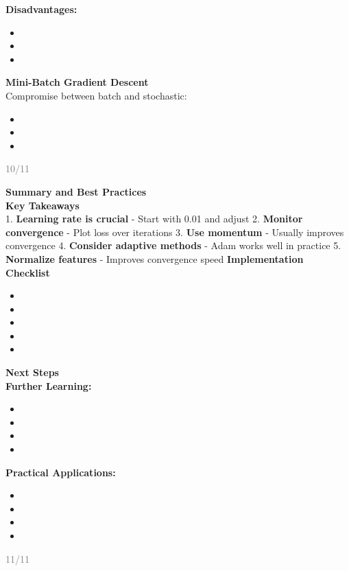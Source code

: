 \documentclass[11pt]{article}
\begin{document}
\textbf{Disadvantages:}
\begin{itemize}
\item \1
\item \1
\item \1
\end{itemize}
\textbf{\Large Mini-Batch Gradient Descent}\\[0.3cm]
Compromise between batch and stochastic:
\begin{itemize}
\item \1
\item \1
\item \1
\end{itemize}\n\n\vfill\n\begin{flushright}\n\textcolor{gray}{\small 10/11}\n\end{flushright}\n\n\newpage\n\n\textbf{\huge Summary and Best Practices}\\[0.5cm]
\textbf{\Large Key Takeaways}\\[0.3cm]
1. \textbf{Learning rate is crucial} - Start with 0.01 and adjust
2. \textbf{Monitor convergence} - Plot loss over iterations
3. \textbf{Use momentum} - Usually improves convergence
4. \textbf{Consider adaptive methods} - Adam works well in practice
5. \textbf{Normalize features} - Improves convergence speed
\textbf{\Large Implementation Checklist}\\[0.3cm]
\begin{itemize}
\item \1
\item \1
\item \1
\item \1
\item \1
\end{itemize}
\textbf{\Large Next Steps}\\[0.3cm]
\textbf{Further Learning:}
\begin{itemize}
\item \1
\item \1
\item \1
\item \1
\end{itemize}
\textbf{Practical Applications:}
\begin{itemize}
\item \1
\item \1
\item \1
\item \1
\end{itemize}\n\n\vfill\n\begin{flushright}\n\textcolor{gray}{\small 11/11}\n\end{flushright}\n\n
\end{document}

